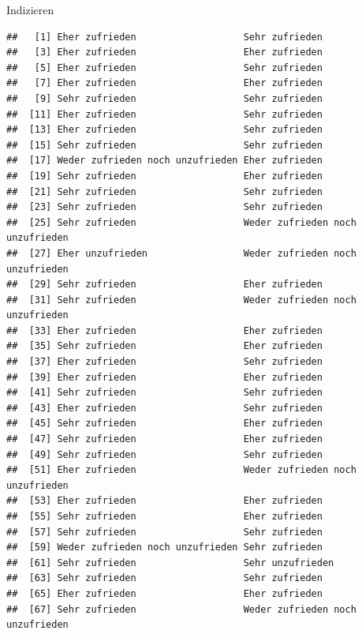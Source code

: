 \documentclass[ignorenonframetext,]{beamer}
\begin{document}
\begin{frame}[fragile]{Indizieren}
\begin{verbatim}
##   [1] Eher zufrieden                   Sehr zufrieden                  
##   [3] Eher zufrieden                   Eher zufrieden                  
##   [5] Eher zufrieden                   Sehr zufrieden                  
##   [7] Eher zufrieden                   Eher zufrieden                  
##   [9] Sehr zufrieden                   Sehr zufrieden                  
##  [11] Eher zufrieden                   Sehr zufrieden                  
##  [13] Eher zufrieden                   Sehr zufrieden                  
##  [15] Sehr zufrieden                   Sehr zufrieden                  
##  [17] Weder zufrieden noch unzufrieden Eher zufrieden                  
##  [19] Sehr zufrieden                   Eher zufrieden                  
##  [21] Sehr zufrieden                   Sehr zufrieden                  
##  [23] Sehr zufrieden                   Sehr zufrieden                  
##  [25] Sehr zufrieden                   Weder zufrieden noch unzufrieden
##  [27] Eher unzufrieden                 Weder zufrieden noch unzufrieden
##  [29] Sehr zufrieden                   Eher zufrieden                  
##  [31] Sehr zufrieden                   Weder zufrieden noch unzufrieden
##  [33] Eher zufrieden                   Eher zufrieden                  
##  [35] Sehr zufrieden                   Eher zufrieden                  
##  [37] Eher zufrieden                   Sehr zufrieden                  
##  [39] Eher zufrieden                   Eher zufrieden                  
##  [41] Sehr zufrieden                   Sehr zufrieden                  
##  [43] Eher zufrieden                   Sehr zufrieden                  
##  [45] Sehr zufrieden                   Eher zufrieden                  
##  [47] Sehr zufrieden                   Eher zufrieden                  
##  [49] Sehr zufrieden                   Sehr zufrieden                  
##  [51] Eher zufrieden                   Weder zufrieden noch unzufrieden
##  [53] Eher zufrieden                   Eher zufrieden                  
##  [55] Sehr zufrieden                   Eher zufrieden                  
##  [57] Sehr zufrieden                   Sehr zufrieden                  
##  [59] Weder zufrieden noch unzufrieden Sehr zufrieden                  
##  [61] Sehr zufrieden                   Sehr unzufrieden                
##  [63] Sehr zufrieden                   Sehr zufrieden                  
##  [65] Eher zufrieden                   Eher zufrieden                  
##  [67] Sehr zufrieden                   Weder zufrieden noch unzufrieden

\end{verbatim}
\end{frame}
\end{document}
